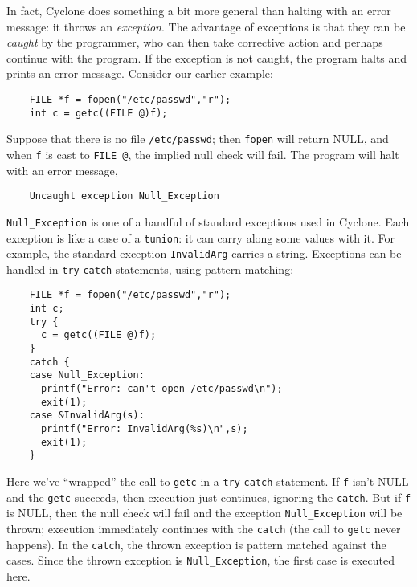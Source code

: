 In fact, Cyclone does something a bit more general than halting with
an error message: it throws an \emph{exception}.  The advantage of
exceptions is that they can be \emph{caught} by the programmer, who
can then take corrective action and perhaps continue with the program.
If the exception is not caught, the program halts and prints an error
message.  Consider our earlier example:
\begin{verbatim}
    FILE *f = fopen("/etc/passwd","r");
    int c = getc((FILE @)f);
\end{verbatim}
Suppose that there is no file \texttt{/etc/passwd}; then
\texttt{fopen} will return NULL, and when \texttt{f} is cast to
\texttt{FILE @}, the implied null check will fail.  The program will
halt with an error message,
\begin{verbatim}
    Uncaught exception Null_Exception
\end{verbatim}
\texttt{Null_Exception} is one of a handful of standard exceptions
used in Cyclone.  Each exception is like a case of a \texttt{tunion}:
it can carry along some values with it.  For example, the standard
exception \texttt{InvalidArg} carries a string.  Exceptions can be
handled in \texttt{try}-\texttt{catch} statements, using pattern
matching:
\begin{verbatim}
    FILE *f = fopen("/etc/passwd","r");
    int c;
    try {
      c = getc((FILE @)f);
    }
    catch {
    case Null_Exception:
      printf("Error: can't open /etc/passwd\n");
      exit(1);
    case &InvalidArg(s):
      printf("Error: InvalidArg(%s)\n",s);
      exit(1);
    }
\end{verbatim}
Here we've ``wrapped'' the call to \texttt{getc} in a
\texttt{try}-\texttt{catch} statement.  If \texttt{f} isn't NULL and
the \texttt{getc} succeeds, then execution just continues, ignoring
the \texttt{catch}.  But if \texttt{f} is NULL, then the null check
will fail and the exception \texttt{Null_Exception} will be thrown;
execution immediately continues with the \texttt{catch} (the call to
\texttt{getc} never happens).  In the \texttt{catch}, the thrown
exception is pattern matched against the cases.  Since the thrown
exception is \texttt{Null_Exception}, the first case is executed here.

